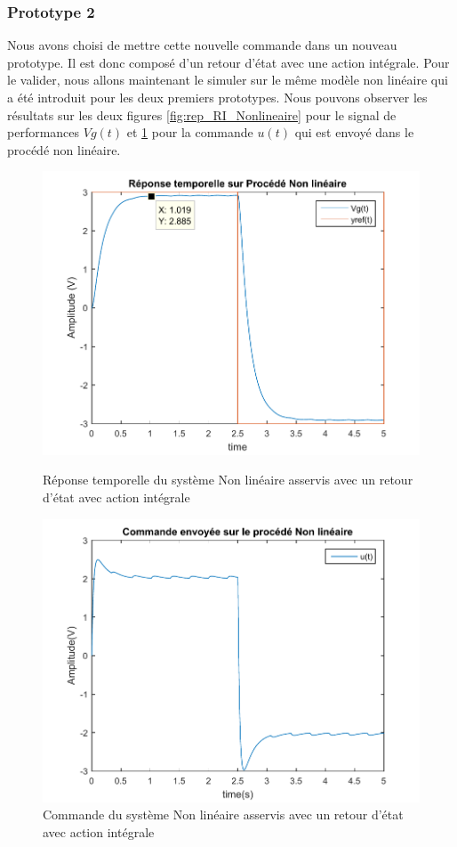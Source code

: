 		\subsubsection{Prototype 2}
		Nous avons choisi de mettre cette nouvelle commande dans un nouveau prototype. Il est donc composé d'un retour d'état avec une action intégrale. Pour le valider, nous allons maintenant le simuler sur le même modèle non linéaire qui a été introduit pour les deux premiers prototypes. Nous pouvons observer les résultats sur les deux figures \ref{fig:rep_RI_Nonlineaire} pour le signal de performances $Vg(t)$ et \ref{fig:com_RI_Nonlineaire} pour la commande $u(t)$ qui est envoyé dans le procédé non linéaire.
		\begin{figure}[!ht]
		\begin{minipage}{.5\textwidth}
		\includegraphics[width = \textwidth]{./IV/images/rep_RI_NonLineaire.pdf}
		\caption{Réponse temporelle du système Non linéaire asservis avec un retour d'état avec action intégrale\label{fig:rep_RI_Nonlineaire}}
\end{minipage}
\begin{minipage}{.5\textwidth}
\includegraphics[width = \textwidth]{./IV/images/com_RI_Nonlineaire.pdf}
\caption{Commande du système Non linéaire asservis avec un retour d'état avec action intégrale\label{fig:com_RI_Nonlineaire}}
\end{minipage}
		\end{figure}
